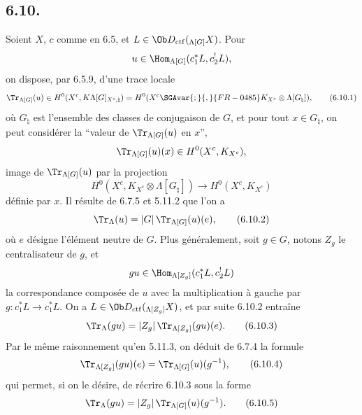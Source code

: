 \subsection*{6.10.}
Soient $X$, $c$ comme en 6.5, et $L\in\Ob D_{\mathrm{ctf}}({}_{\Lambda[G]}X)$. Pour
\[
u\in\Hom_{\Lambda[G]}(c_1^*L,c_2^!L),
\]
on dispose, par 6.5.9, d'une trace locale
\begin{equation}
\Tr_{\Lambda[G]}(u)\in
H^0(X^c,K\Lambda[G]_{X^c,\natural})
=H^0(X^c\SGAvar{;}{,}{FR-0485}K_{X^c}\otimes\Lambda[G_{\natural}]),
\tag{6.10.1}
\end{equation}
où $G_{\natural}$ est l'ensemble des classes de conjugaison de $G$, et pour tout $x\in G_{\natural}$, on peut considérer la ``valeur de $\Tr_{\Lambda[G]}(u)$ en $x$'',
\[
\Tr_{\Lambda[G]}(u)(x)\in H^0(X^c,K_{X^c}),
\]
image de $\Tr_{\Lambda[G]}(u)$ par la projection
\[
H^0(X^c,K_{X^c}\otimes\Lambda[G_{\natural}])
\longrightarrow H^0(X^c,K_{X^c})
\]
définie par $x$. Il résulte de 6.7.5 et 5.11.2 que l'on a
\begin{equation}
\Tr_{\Lambda}(u)=|G|\,\Tr_{\Lambda[G]}(u)(e),
\tag{6.10.2}
\end{equation}
où $e$ désigne l'élément neutre de $G$. Plus généralement, soit $g\in G$, notons $Z_g$ le centralisateur de $g$, et
\[
gu\in\Hom_{\Lambda[Z_g]}(c_1^*L,c_2^!L)
\]
la correspondance composée de $u$ avec la multiplication à gauche par $g:c_1^*L\to c_1^*L$. On a $L\in\Ob D_{\mathrm{ctf}}({}_{\Lambda[Z_g]}X)$, et par suite 6.10.2 entraîne
\begin{equation}
\Tr_{\Lambda}(gu)=|Z_g|\,\Tr_{\Lambda[Z_g]}(gu)(e).
\tag{6.10.3}
\end{equation}
Par le même raisonnement qu'en 5.11.3, on déduit de 6.7.4 la formule
\begin{equation}
\Tr_{\Lambda[Z_g]}(gu)(e)=\Tr_{\Lambda[G]}(u)(g^{-1}),
\tag{6.10.4}
\end{equation}
qui permet, si on le désire, de récrire 6.10.3 sous la forme
\begin{equation}
\Tr_{\Lambda}(gu)=|Z_g|\,\Tr_{\Lambda[G]}(u)(g^{-1}).
\tag{6.10.5}
\end{equation}

